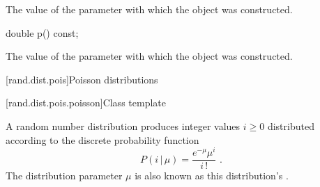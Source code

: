 \begin{itemdescr}
\pnum
\returns
The value of the  parameter
 with which the object was constructed.
\end{itemdescr}

%
\begin{itemdecl}
double p() const;
\end{itemdecl}

\begin{itemdescr}
\pnum
\returns
The value of the  parameter
 with which the object was constructed.
\end{itemdescr}%
%
%



[rand.dist.pois]{Poisson distributions}%
%
%


[rand.dist.pois.poisson]{Class template }%
%

\pnum
A  random number distribution
produces integer values $i \geq 0$
distributed according to
the discrete probability function
\[ P(i\,|\,\mu) = \frac{e^{-\mu} \mu^{i}}{i\,!} \text{ .} \]
The distribution parameter $\mu$
is also known as this distribution's %
.


